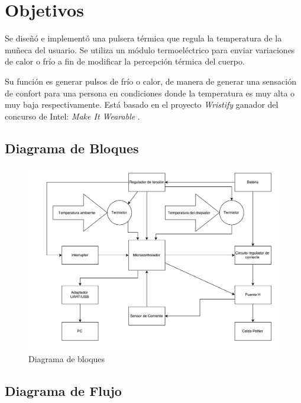 \documentclass[10pt,spanish,a4paper,openany,notitlepage]{article}
\begin{document}
\tableofcontents
\newpage

\section{Objetivos}
Se diseñó e implementó una pulsera térmica que regula la temperatura
de la muñeca del usuario. Se utiliza un módulo termoeléctrico para enviar
variaciones de calor o frío a fin de modificar
la percepción térmica del cuerpo.

Su función es generar pulsos de frío o calor, de manera de generar una sensación de 
confort para una persona en condiciones donde la temperatura es muy alta 
o muy baja respectivamente.
Está basado en el proyecto \emph{Wristify} \cite{embrlabs} ganador del concurso de Intel: 
\emph{Make It Wearable} \cite{Make It Wearable}.

\subsection{Diagrama de Bloques}

\begin{figure}[H] %
\begin{center}
\includegraphics[scale=0.55]{./imagenes/diagrama_de_bloques.pdf}
\caption{Diagrama de bloques}
 \label{fig:diag_bloques}
\end{center}
\end{figure}



\subsection{Diagrama de Flujo}
\end{document}
